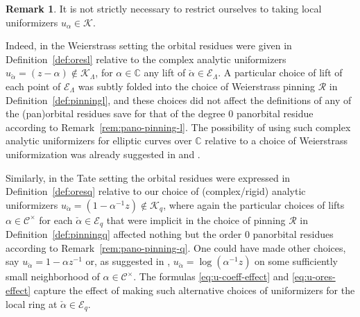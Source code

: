 \documentclass[preprint,12pt]{elsarticle}
\numberwithin{equation}{section} %
\theoremstyle{theorem}
\theoremstyle{definition}
\newtheorem{remark}[theorem]{Remark}
\newcommand{\Cq}{\mathcal{C}} %
\newcommand{\bk}{\mathcal{K}} %
\newcommand{\bkl}{\bk_{\Lambda}} %
\newcommand{\bkq}{\bk_{q}} %
\newcommand{\ec}{\mathcal{E}} %
\newcommand{\ecl}{\ec_{\Lambda}} %
\newcommand{\ecq}{\ec_{q}}
\newcommand{\C}{\mathbb{C}} %
\begin{document}
\begin{remark}\label{rem:outer-uniformizers}
It is not strictly necessary to restrict ourselves to taking local uniformizers $u_\alpha\in \bk$.

Indeed, in the Weierstrass setting the orbital residues were given in Definition~\ref{def:oresl} relative to the complex analytic uniformizers \mbox{$u_{\check{\alpha}}=(z-\alpha)\notin\bkl$,} for $\alpha\in\C$ any lift of $\check{\alpha}\in\ecl$. A particular choice of lift of each point of $\ecl$ was subtly folded into the choice of Weierstrass pinning $\mathcal{R}$ in Definition~\ref{def:pinningl}, and these choices did not affect the definitions of any of the (pan)orbital residues save for that of the degree $0$ panorbital residue according to Remark~\ref{rem:pano-pinning-l}. The possibility of using such complex analytic uniformizers for elliptic curves over $\C$ relative to a choice of Weierstrass uniformization was already suggested in \cite[Remark~B.10]{Dreyfus2018} and \cite[Remark~A.8(1)]{Hardouin2021}.

Similarly, in the Tate setting the orbital residues were expressed in \mbox{Definition~\ref{def:oresq}} relative to our choice of (complex/rigid) analytic uniformizers $u_{\check{\alpha}}=(1-\alpha^{-1}z)\notin\bkq$, where again the particular choices of lifts $\alpha\in\Cq^\times$ for each $\check{\alpha}\in\ecq$ that were implicit in the choice of pinning $\mathcal{R}$ in \mbox{Definition~\ref{def:pinningq}} affected nothing but the order $0$ panorbital residues according to Remark~\ref{rem:pano-pinning-q}. One could have made other choices, say $u_{\check{\alpha}}=1-\alpha z^{-1}$ or, as suggested in \cite[Remark~A.8(2)]{Hardouin2021}, $u_{\check{\alpha}}=\log(\alpha^{-1}z)$ on some sufficiently small neighborhood of $\alpha\in\Cq^\times$. The formulas \eqref{eq:u-coeff-effect} and \eqref{eq:u-ores-effect} capture the effect of making such alternative choices of uniformizers for the local ring at $\check{\alpha}\in\ecq$.


\end{remark}
\end{document}
